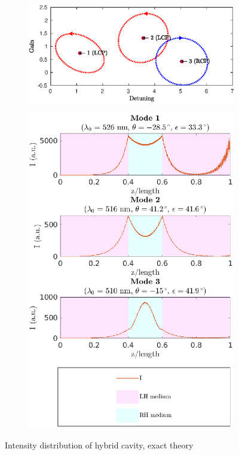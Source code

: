 \begin{figure}
	\centering
	\begin{subfigure}{\linewidth}
		\includegraphics[width=\linewidth]{plots/hybrid/modes_found_oseen}
		\caption{}
	\end{subfigure}
	\begin{subfigure}{\linewidth}
		\centering
		\includegraphics[height=0.5\textheight]{plots/hybrid/intensity_distribution_oseen}
		\caption{}
	\end{subfigure}
	\caption[Intensity distribution of hybrid cavity, exact theory]{Intensity distribution of hybrid cavity, exact theory}
	\label{fig:hybrid_intensity_appendix}
\end{figure}

